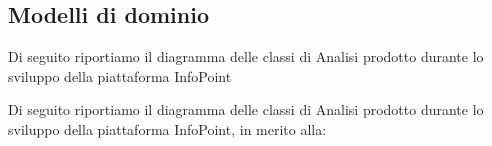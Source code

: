     \subsection{Modelli di dominio}
      \begin{center}
            Di seguito riportiamo il diagramma delle classi di Analisi prodotto durante lo sviluppo della piattaforma InfoPoint
      \end{center}

      \begin{center}
            Di seguito riportiamo il diagramma delle classi di Analisi prodotto durante lo sviluppo della piattaforma InfoPoint, in merito alla:
      \end{center}
    \newpage

